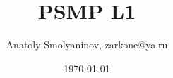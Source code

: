 \documentclass[14pt]{extarticle}
\author{Anatoly Smolyaninov, zarkone@ya.ru}
\date{\today}
\title{PSMP L1}
\begin{document}
\hypersetup{ hidelinks=true }




\newcommand{\anonsection}[1]{
  \paragraph{\centerline{{#1}}}
  \addcontentsline{toc}{section}{#1}
}

\newcommand{\anonsubsection}[1]{
  \paragraph{{#1}}
  \addcontentsline{toc}{subsection}{#1}
}

\newcommand{\append}[1]{
  \stepcounter{section}
  \newpage
  \renewcommand\thesection{\Asbuk{section}}
  \renewcommand\thesubsection{\Asbuk{section}.\arabic{subsection}}
  \paragraph{\centerline{Приложение \Asbuk{section}}}
  \paragraph{\centerline{{#1}}}
  \addcontentsline{toc}{section}{Приложение \Asbuk{section} #1}
}
\newcommand{\tabitem}{~~\llap{\textbullet}~~}




\newpage


\newpage
\end{document}
